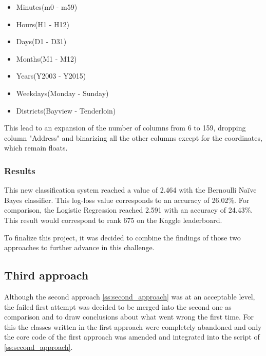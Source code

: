 \documentclass[12pt,a4paper]{scrartcl}
\begin{document}
\begin{itemize}
\item Minutes(m0 - m59)
\item Hours(H1 - H12)
\item Days(D1 - D31)
\item Months(M1 - M12)
\item Years(Y2003 - Y2015)
\item Weekdays(Monday - Sunday)
\item Districts(Bayview - Tenderloin)
\end{itemize}









This lead to an expansion of the number of columns from 6 to 159, dropping column "Address" and binarizing all the other columns except for the coordinates, which remain floats.

\subsubsection{Results}\label{sss:results2}
This new classification system reached a value of 2.464 with the Bernoulli Naïve Bayes classifier. This log-loss value corresponds to an accuracy of 26.02\%. For comparison, the Logistic Regression reached 2.591 with an accuracy of 24.43\%. This result would correspond to rank 675 on the Kaggle leaderboard.

To finalize this project, it was decided to combine the findings of those two approaches to further advance in this challenge.

\pagebreak
\subsection{Third approach}\label{ss:third_approach}
Although the second approach \ref{ss:second_approach} was at an acceptable level, the failed first attempt was decided to be merged into the second one as comparison and to draw conclusions about what went wrong the first time. For this the classes written in the first approach were completely abandoned and only the core code of the first approach was amended and integrated into the script of \ref{ss:second_approach}.
\end{document}
